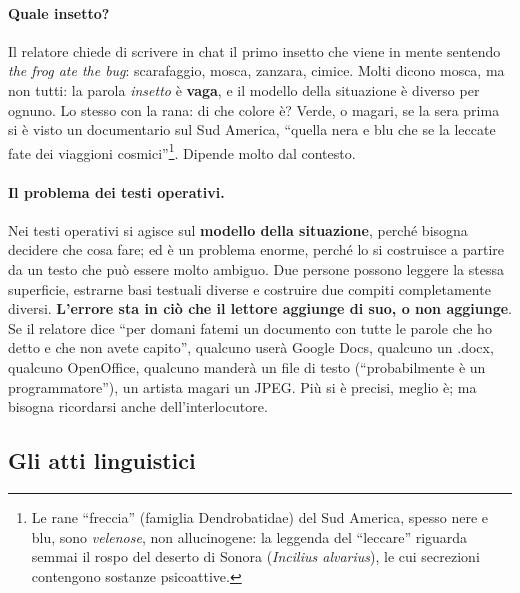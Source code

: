 \paragraph{Quale insetto?} Il relatore chiede di scrivere in chat il primo
insetto che viene in mente sentendo \emph{the frog ate the bug}: scarafaggio,
mosca, zanzara, cimice. Molti dicono mosca, ma non tutti: la parola
\emph{insetto} è \textbf{vaga}, e il modello della situazione è diverso per
ognuno. Lo stesso con la rana: di che colore è? Verde, o magari, se la sera
prima si è visto un documentario sul Sud America, ``quella nera e blu che se la
leccate fate dei viaggioni cosmici''\footnote{Le rane ``freccia'' (famiglia
Dendrobatidae) del Sud America, spesso nere e blu, sono \emph{velenose}, non
allucinogene: la leggenda del ``leccare'' riguarda semmai il rospo del deserto
di Sonora (\emph{Incilius alvarius}), le cui secrezioni contengono sostanze
psicoattive.}. Dipende molto dal contesto.

\paragraph{Il problema dei testi operativi.} Nei testi operativi si agisce sul
\textbf{modello della situazione}, perché bisogna decidere che cosa fare; ed è
un problema enorme, perché lo si costruisce a partire da un testo che può essere
molto ambiguo. Due persone possono leggere la stessa superficie, estrarne basi
testuali diverse e costruire due compiti completamente diversi. \textbf{L'errore
sta in ciò che il lettore aggiunge di suo, o non aggiunge}. Se il relatore dice
``per domani fatemi un documento con tutte le parole che ho detto e che non
avete capito'', qualcuno userà Google Docs, qualcuno un .docx, qualcuno
OpenOffice, qualcuno manderà un file di testo (``probabilmente è un
programmatore''), un artista magari un JPEG. Più si è precisi, meglio è; ma
bisogna ricordarsi anche dell'interlocutore.

\subsection{Gli atti linguistici}


